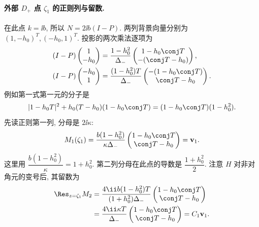 \paragraph{外部 $D_+$ 点 $\zeta_1$ 的正则列与留数.}
在此点 $k=\ii b$, 所以 $N=2\ii b(I-P)$.
两列背景向量分别为 $(1,-h_0)^T,(-h_0,1)^T$.
投影的两次乘法逐项为
\[
\begin{aligned}
(I-P)\begin{pmatrix}1\\-h_0\end{pmatrix}
&=\dfrac{1-h_0^2}{\Delta_-}
\begin{pmatrix}1-h_0\conj T\\-(\conj T-h_0)\end{pmatrix},\\
(I-P)\begin{pmatrix}-h_0\\1\end{pmatrix}
&=\dfrac{(1-h_0^2)T}{\Delta_-}
\begin{pmatrix}-(1-h_0\conj T)\\\conj T-h_0\end{pmatrix}.
\end{aligned}
\]
例如第一式第一元的分子是
\[
|1-h_0T|^2+h_0(T-h_0)(1-h_0\conj T)
=(1-h_0\conj T)(1-h_0^2).
\]
先读正则第一列, 分母是 $2\ii\kappa$:
\[
M_1(\zeta_1)
=\dfrac{b(1-h_0^2)}{\kappa\Delta_-}
\begin{pmatrix}1-h_0\conj T\\\conj T-h_0\end{pmatrix}
=\mathbf v_1.
\]
这里用 $\dfrac{b(1-h_0^2)}{\kappa}=1+h_0^2$.
第二列分母在此点的导数是 $\dfrac{1+h_0^2}{2}$.
注意 $H$ 对非对角元的变号后, 其留数为
\[
\begin{aligned}
\Res_{z=\zeta_1}M_2
&=\dfrac{4\ii b(1-h_0^2)T}{(1+h_0^2)\Delta_-}
\begin{pmatrix}1-h_0\conj T\\\conj T-h_0\end{pmatrix}\\
&=\dfrac{4\ii\kappa T}{\Delta_-}
\begin{pmatrix}1-h_0\conj T\\\conj T-h_0\end{pmatrix}
=C_1\mathbf v_1.
\end{aligned}
\]

